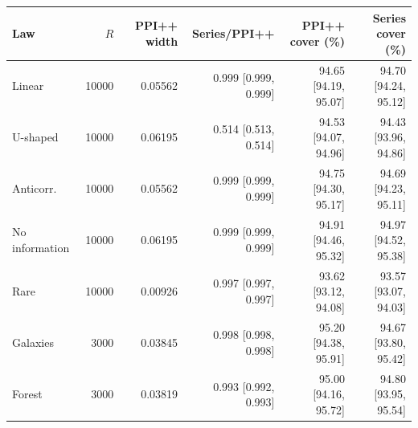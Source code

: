 \begin{tabular}{lrrrrr}
\toprule
Law & $R$ & PPI++ width & Series/PPI++ & PPI++ cover (\%) & Series cover (\%)\\
\midrule
Linear & 10000 & 0.05562 & 0.999 [0.999, 0.999] & 94.65 [94.19, 95.07] & 94.70 [94.24, 95.12]\\
U-shaped & 10000 & 0.06195 & 0.514 [0.513, 0.514] & 94.53 [94.07, 94.96] & 94.43 [93.96, 94.86]\\
Anticorr. & 10000 & 0.05562 & 0.999 [0.999, 0.999] & 94.75 [94.30, 95.17] & 94.69 [94.23, 95.11]\\
No information & 10000 & 0.06195 & 0.999 [0.999, 0.999] & 94.91 [94.46, 95.32] & 94.97 [94.52, 95.38]\\
Rare & 10000 & 0.00926 & 0.997 [0.997, 0.997] & 93.62 [93.12, 94.08] & 93.57 [93.07, 94.03]\\
Galaxies & 3000 & 0.03845 & 0.998 [0.998, 0.998] & 95.20 [94.38, 95.91] & 94.67 [93.80, 95.42]\\
Forest & 3000 & 0.03819 & 0.993 [0.992, 0.993] & 95.00 [94.16, 95.72] & 94.80 [93.95, 95.54]\\
\bottomrule
\end{tabular}